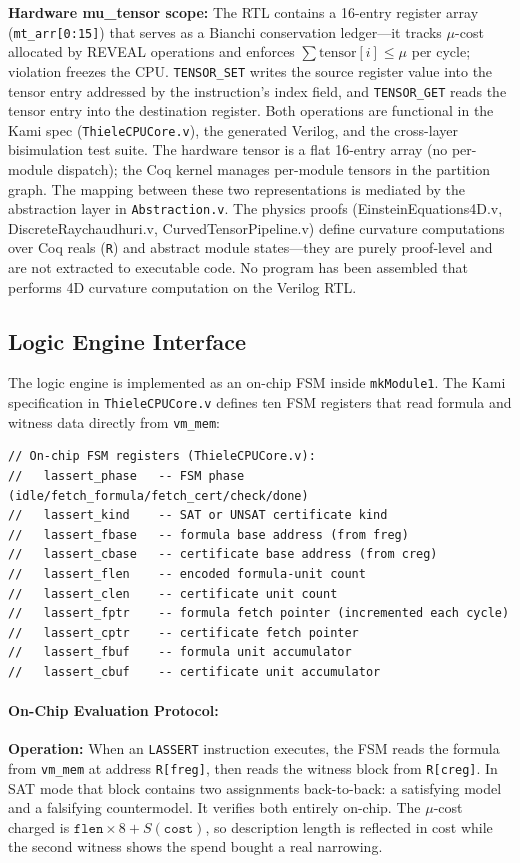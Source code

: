\textbf{Hardware mu\_tensor scope:} The RTL contains a 16-entry register array (\texttt{mt\_arr[0:15]}) that serves as a Bianchi conservation ledger---it tracks $\mu$-cost allocated by REVEAL operations and enforces $\sum\text{tensor}[i] \le \mu$ per cycle; violation freezes the CPU. \texttt{TENSOR\_SET} writes the source register value into the tensor entry addressed by the instruction's index field, and \texttt{TENSOR\_GET} reads the tensor entry into the destination register. Both operations are functional in the Kami spec (\texttt{ThieleCPUCore.v}), the generated Verilog, and the cross-layer bisimulation test suite. The hardware tensor is a flat 16-entry array (no per-module dispatch); the Coq kernel manages per-module tensors in the partition graph. The mapping between these two representations is mediated by the abstraction layer in \texttt{Abstraction.v}. The physics proofs (EinsteinEquations4D.v, DiscreteRaychaudhuri.v, CurvedTensorPipeline.v) define curvature computations over Coq reals (\texttt{R}) and abstract module states---they are purely proof-level and are not extracted to executable code. No program has been assembled that performs 4D curvature computation on the Verilog RTL.

\subsection{Logic Engine Interface}

The logic engine is implemented as an on-chip FSM inside \texttt{mkModule1}. The Kami specification in \texttt{ThieleCPUCore.v} defines ten FSM registers that read formula and witness data directly from \texttt{vm\_mem}:
\begin{lstlisting}
// On-chip FSM registers (ThieleCPUCore.v):
//   lassert_phase   -- FSM phase (idle/fetch_formula/fetch_cert/check/done)
//   lassert_kind    -- SAT or UNSAT certificate kind
//   lassert_fbase   -- formula base address (from freg)
//   lassert_cbase   -- certificate base address (from creg)
//   lassert_flen    -- encoded formula-unit count
//   lassert_clen    -- certificate unit count
//   lassert_fptr    -- formula fetch pointer (incremented each cycle)
//   lassert_cptr    -- certificate fetch pointer
//   lassert_fbuf    -- formula unit accumulator
//   lassert_cbuf    -- certificate unit accumulator
\end{lstlisting}

\paragraph{On-Chip Evaluation Protocol:}
\textbf{Operation:} When an \texttt{LASSERT} instruction executes, the FSM reads the formula from \texttt{vm\_mem} at address \texttt{R[freg]}, then reads the witness block from \texttt{R[creg]}. In SAT mode that block contains two assignments back-to-back: a satisfying model and a falsifying countermodel. It verifies both entirely on-chip. The $\mu$-cost charged is $\mathtt{flen} \times 8 + S(\mathtt{cost})$, so description length is reflected in cost while the second witness shows the spend bought a real narrowing.

